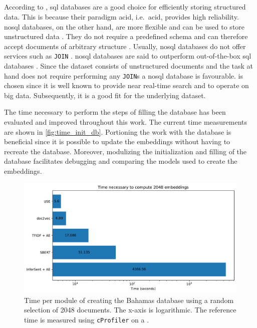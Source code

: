 \subsection*{\databaseName{}}\label{subsec:evaluation-db}
According to \citeauthor{flask_book2018}, \ac{sql} databases are a good choice for efficiently storing structured data.
This is because their paradigm \acs{acid}, i.e.\ \acl{acid}, provides high reliability.
\ac{nosql} databases, on the other hand, are more flexible and can be used to store unstructured data \cite{flask_book2018}.
They do not require a predefined schema and can therefore accept documents of arbitrary structure \cite{flask2018}.
Usually, \ac{nosql} databases do not offer services such as \texttt{JOIN} \cite{flask2018}.
\ac{nosql} databases are said to outperform out-of-the-box \ac{sql} databases \cite{flask2018}.
Since the dataset consists of unstructured documents and the task at hand does not require performing any \texttt{JOIN}s a \ac{nosql} database is favourable.
\databaseName{} is chosen since it is well known to provide near real-time search and to operate on big data.
Subsequently, it is a good fit for the underlying dataset.

The time necessary to perform the steps of filling the \databaseName{} database has been evaluated and improved throughout this work.
The current time measurements are shown in \autoref{fig:time_init_db}.
Portioning the work with the database is beneficial since it is possible to update the embeddings without having to recreate the database.
Moreover, modulizing the initialization and filling of the database facilitates debugging and comparing the models used to create the embeddings.

\begin{figure}[!htb] %
    \centering
    \includegraphics[width=1\textwidth]{images/Elasticsearch/Time_necessary_to_compute_2048_embeddings_log.pdf}
    \caption[Times for creating the database]{Time per module of creating the Bahamas database using a random selection of 2048 documents.
    The x-axis is logarithmic.
    The reference time is measured using \texttt{cProfiler} on a \localMaschineStats{}.
    }
    \label{fig:time_init_db}
\end{figure}


